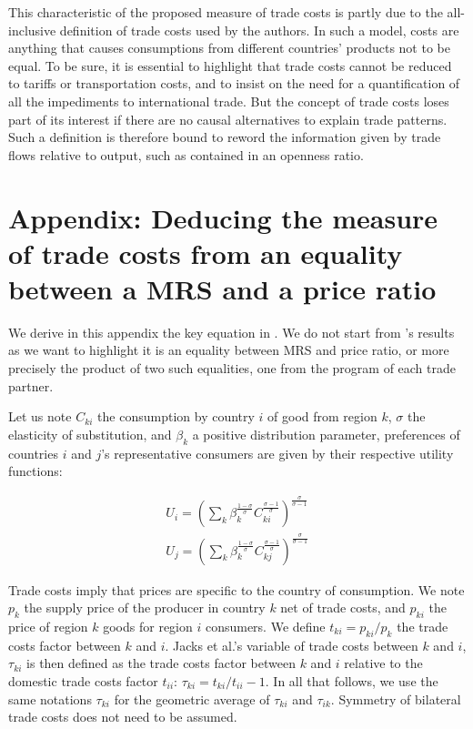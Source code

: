 \documentclass{article}
\begin{document}
This characteristic of the proposed measure of trade costs is
partly due to the all-inclusive definition of trade
costs used by the authors. In such a model, costs are anything
that causes consumptions from different countries' products not
to be equal. To be sure, it is essential to highlight that
trade costs cannot be reduced to tariffs or transportation
costs, and to insist on the need for a quantification of all
the impediments to international trade. But the concept of
trade costs loses part of its interest if there are no causal
alternatives to explain trade patterns. Such a definition is
therefore bound to reword the information given by trade
flows relative to output, such as contained in an openness
ratio.

\appendix

\section{\label{A1}Appendix: Deducing the measure of trade costs from an equality between a MRS and a price ratio}

We derive in this appendix the key equation in \cite{JMN2011}.
We do not start from \cite{AW2003}'s results as we want to
highlight it is an equality between MRS and price ratio, or
more precisely the product of two such equalities, one from the
program of each trade partner.

Let us note $C_{ki}$ the consumption by country $i$ of good from
region $k$, $\sigma$ the elasticity of substitution, and
$\beta_k$ a positive distribution parameter, preferences of
countries $i$ and $j$'s representative consumers are given by
their respective utility functions:

\begin{eqnarray*}
U_i=\left(\sum_k\beta_{k}^{\frac{1-\sigma}{\sigma}}C_{ki}^{\frac{\sigma-1}{\sigma}}\right)^{\frac{\sigma}{\sigma-1}}\\
U_j=\left(\sum_k\beta_{k}^{\frac{1-\sigma}{\sigma}}C_{kj}^{\frac{\sigma-1}{\sigma}}\right)^{\frac{\sigma}{\sigma-1}}
\end{eqnarray*}

Trade costs imply that prices are specific to the country of
consumption. We note $p_k$ the supply price of the producer in
country $k$ net of trade costs, and $p_{ki}$ the price of
region $k$ goods for region $i$ consumers. We define
$t_{ki}=p_{ki}/p_{k}$ the trade costs factor between $k$ and
$i$. Jacks et al.'s variable of trade costs between $k$ and
$i$, $\tau_{ki}$ is then defined as the trade costs factor
between $k$ and $i$ relative to the domestic trade costs factor
$t_{ii}$: $\tau_{ki}=t_{ki}/t_{ii}-1$. In all that follows, we
use the same notations $\tau_{ki}$ for the geometric average of
$\tau_{ki}$ and $\tau_{ik}$. Symmetry of bilateral trade costs
does not need to be assumed.
\end{document}

